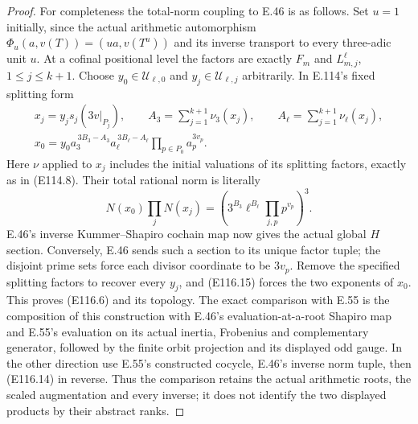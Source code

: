 \begin{proof}
For completeness the total-norm coupling to E.46 is as
follows. Set $u=1$ initially, since the actual arithmetic
automorphism $\Phi_u(a,v(T))=(ua,v(T^u))$ and its inverse
transport to every three-adic unit $u$.
At a cofinal positional level the factors are exactly
$F_m$ and $L^\ell_{m,j}$, $1\le j\le k+1$.
Choose $y_0\in\mathcal U_{\ell,0}$ and
$y_j\in\mathcal U_{\ell,j}$ arbitrarily. In E.114's
fixed splitting form
\[
 \begin{gathered}
 x_j=y_j s_j(3v|_{P_j}),\qquad
 A_3=\sum_{j=1}^{k+1}\nu_3(x_j),\qquad
 A_\ell=\sum_{j=1}^{k+1}\nu_\ell(x_j),\\
 x_0=y_0 a_3^{\,3B_3-A_3}a_\ell^{\,3B_\ell-A_\ell}
              \prod_{p\in P_0}a_p^{3v_p}.
 \end{gathered}
 \tag{E116.14}
\]
Here $\nu$ applied to $x_j$ includes the initial valuations
of its splitting factors, exactly as in (E114.8).
Their total rational norm is literally
\[
 N(x_0)\prod_jN(x_j)
       =\left(3^{B_3}\ell^{B_\ell}
                    \prod_{j,p}p^{v_p}\right)^3.
 \tag{E116.15}
\]
E.46's inverse Kummer--Shapiro cochain map now gives the
actual global $H$ section. Conversely, E.46 sends such
a section to its unique factor tuple; the disjoint prime
sets force each divisor coordinate to be $3v_p$.
Remove the specified splitting factors to recover every
$y_j$, and (E116.15) forces the two exponents of $x_0$.
This proves (E116.6) and its topology.
The exact comparison with E.55 is the composition of
this construction with E.46's evaluation-at-a-root
Shapiro map and E.55's evaluation on its actual inertia,
Frobenius and complementary generator, followed by the
finite orbit projection and its displayed odd gauge.
In the other direction use E.55's constructed cocycle,
E.46's inverse norm tuple, then (E116.14) in reverse.
Thus the comparison retains the actual arithmetic roots,
the scaled augmentation and every inverse; it does not
identify the two displayed products by their abstract ranks.


\end{proof}
